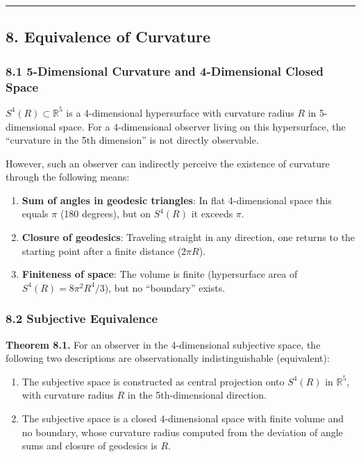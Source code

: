 \documentclass[a4paper,11pt]{article}
\providecommand{\tightlist}{\setlength{\itemsep}{0pt}\setlength{\parskip}{0pt}}
\begin{document}
\begin{center}\rule{0.5\linewidth}{0.5pt}\end{center}

\subsection{8. Equivalence of Curvature}\label{equivalence-of-curvature}

\subsubsection{8.1 5-Dimensional Curvature and 4-Dimensional Closed
Space}\label{dimensional-curvature-and-4-dimensional-closed-space}

\(S^4(R) \subset \mathbb{R}^5\) is a 4-dimensional hypersurface with
curvature radius \(R\) in 5-dimensional space. For a 4-dimensional
observer living on this hypersurface, the ``curvature in the 5th
dimension'' is not directly observable.

However, such an observer can indirectly perceive the existence of
curvature through the following means:

\begin{enumerate}
\def\labelenumi{\arabic{enumi}.}
\tightlist
\item
  \textbf{Sum of angles in geodesic triangles}: In flat 4-dimensional
  space this equals \(\pi\) (180 degrees), but on \(S^4(R)\) it exceeds
  \(\pi\).
\item
  \textbf{Closure of geodesics}: Traveling straight in any direction,
  one returns to the starting point after a finite distance
  (\(2\pi R\)).
\item
  \textbf{Finiteness of space}: The volume is finite (hypersurface area
  of \(S^4(R) = 8\pi^2 R^4/3\)), but no ``boundary'' exists.
\end{enumerate}

\subsubsection{8.2 Subjective Equivalence}\label{subjective-equivalence}

\textbf{Theorem 8.1.} For an observer in the 4-dimensional subjective
space, the following two descriptions are observationally
indistinguishable (equivalent):

\begin{enumerate}
\def\labelenumi{(\alph{enumi})}
\item
  The subjective space is constructed as central projection onto
  \(S^4(R)\) in \(\mathbb{R}^5\), with curvature radius \(R\) in the
  5th-dimensional direction.
\item
  The subjective space is a closed 4-dimensional space with finite
  volume and no boundary, whose curvature radius computed from the
  deviation of angle sums and closure of geodesics is \(R\).
\end{enumerate}
\end{document}
